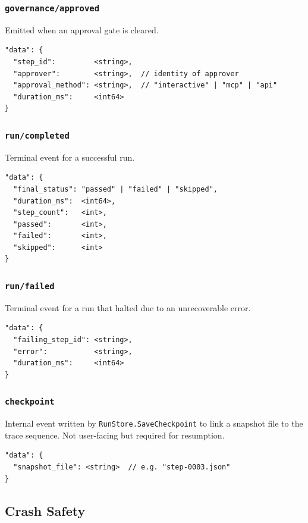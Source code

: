 \subsubsection{\texttt{governance/approved}}

Emitted when an approval gate is cleared.

\begin{verbatim}
"data": {
  "step_id":         <string>,
  "approver":        <string>,  // identity of approver
  "approval_method": <string>,  // "interactive" | "mcp" | "api"
  "duration_ms":     <int64>
}
\end{verbatim}

\subsubsection{\texttt{run/completed}}

Terminal event for a successful run.

\begin{verbatim}
"data": {
  "final_status": "passed" | "failed" | "skipped",
  "duration_ms":  <int64>,
  "step_count":   <int>,
  "passed":       <int>,
  "failed":       <int>,
  "skipped":      <int>
}
\end{verbatim}

\subsubsection{\texttt{run/failed}}

Terminal event for a run that halted due to an unrecoverable error.

\begin{verbatim}
"data": {
  "failing_step_id": <string>,
  "error":           <string>,
  "duration_ms":     <int64>
}
\end{verbatim}

\subsubsection{\texttt{checkpoint}}

Internal event written by \texttt{RunStore.SaveCheckpoint} to link a snapshot file to the trace sequence. Not user-facing but required for resumption.

\begin{verbatim}
"data": {
  "snapshot_file": <string>  // e.g. "step-0003.json"
}
\end{verbatim}

\subsection{Crash Safety}

